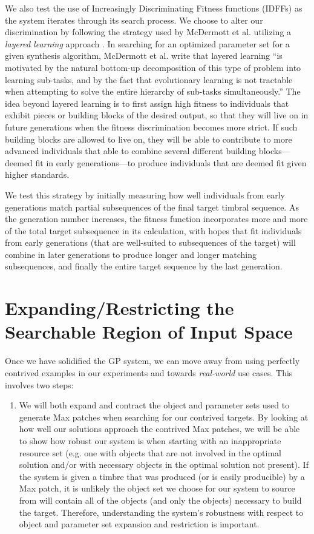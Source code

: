 \documentclass[12pt]{report} 	%
\numberwithin{figure}{chapter}
\numberwithin{table}{chapter}
\numberwithin{equation}{chapter}
\begin{document}
\begin{flushleft}
We also test the use of Increasingly Discriminating Fitness functions (IDFFs) as the system iterates through its search process. We choose to alter our discrimination by following the strategy used by McDermott et al. utilizing a \textit{layered learning} approach \cite[p. 3]{McDermott:2006jd}. In searching for an optimized parameter set for a given synthesis algorithm, McDermott et al. write that layered learning ``is motivated by the natural bottom-up decomposition of this type of problem into learning sub-tasks, and by the fact that evolutionary learning is not tractable when attempting to solve the entire hierarchy of sub-tasks simultaneously.'' The idea beyond layered learning is to first assign high fitness to individuals that exhibit pieces or building blocks of the desired output, so that they will live on in future generations when the fitness discrimination becomes more strict. If such building blocks are allowed to live on, they will be able to contribute to more advanced individuals that able to combine several different building blocks---deemed fit in early generations---to produce individuals that are deemed fit given higher standards.

We test this strategy by initially measuring how well individuals from early generations match partial subsequences of the final target timbral sequence. As the generation number increases, the fitness function incorporates more and more of the total target subsequence in its calculation, with hopes that fit individuals from early generations (that are well-suited to subsequences of the target) will combine in later generations to produce longer and longer matching subsequences, and finally the entire target sequence by the last generation.

\vspace{12pt}\section{Expanding/Restricting the Searchable Region of Input Space}
Once we have solidified the GP system, we can move away from using perfectly contrived examples in our experiments and towards \textit{real-world} use cases. This involves two steps:

\begin{enumerate}
\item We will both expand and contract the object and parameter sets used to generate Max patches when searching for our contrived targets. By looking at how well our solutions approach the contrived Max patches, we will be able to show how robust our system is when starting with an inappropriate resource set (e.g. one with objects that are not involved in the optimal solution and/or with necessary objects in the optimal solution not present). If the system is given a timbre that was produced (or is easily producible) by a Max patch, it is unlikely the object set we choose for our system to source from will contain all of the objects (and only the objects) necessary to build the target. Therefore, understanding the system's robustness with respect to object and parameter set expansion and restriction is important.


\end{enumerate}
\end{flushleft}
\end{document}
